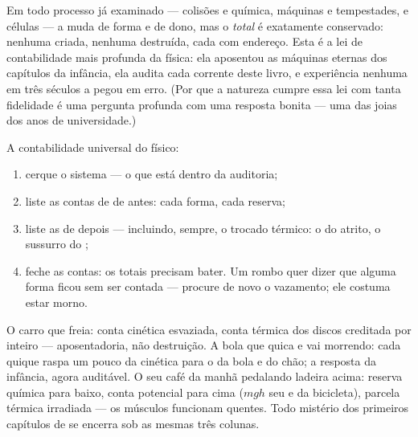 \begin{proposition}\label{prop:g9:energy-conversions:conservation}
Em todo processo já examinado --- colisões e química, máquinas e
tempestades,  e células --- a  muda de forma e de
dono, mas o \emph{total} é exatamente conservado: nenhuma criada,
nenhuma destruída, cada  com endereço. Esta é a lei de
contabilidade mais profunda da física: ela aposentou as máquinas
eternas dos capítulos da infância, ela audita cada corrente deste
livro, e experiência nenhuma em três séculos a pegou em erro. (Por
que a natureza cumpre essa lei com tanta fidelidade é uma pergunta
profunda com uma resposta bonita --- uma das joias dos anos de
universidade.)
\end{proposition}

\begin{method}\label{met:g9:energy-conversions:audit}
A contabilidade universal do físico:
\begin{enumerate}
  \item cerque o sistema --- o que está dentro da auditoria;
  \item liste as contas de  de antes: cada forma, cada
        reserva;
  \item liste as de depois --- incluindo, sempre, o trocado térmico:
        o  do atrito, o sussurro do ;
  \item feche as contas: os totais precisam bater. Um rombo quer
        dizer que alguma forma ficou sem ser contada --- procure de
        novo o vazamento; ele costuma estar morno.
\end{enumerate}
\end{method}

\begin{example}\label{ex:g9:energy-conversions:audits}
O carro que freia: conta cinética esvaziada, conta térmica dos discos
creditada por inteiro --- aposentadoria, não destruição. A bola que
quica e vai morrendo: cada quique raspa um pouco da cinética para o
 da bola e do chão; a resposta da infância, agora auditável. O
seu café da manhã pedalando ladeira acima: reserva química para
baixo, conta potencial para cima ($m g h$ seu e da bicicleta),
parcela térmica irradiada --- os músculos funcionam quentes. Todo
mistério dos primeiros capítulos de  se encerra sob as mesmas
três colunas.
\end{example}


